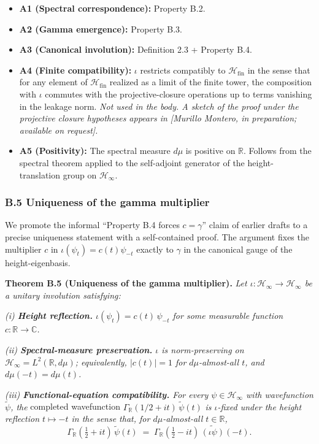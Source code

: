 \documentclass[
  letterpaper,
  11pt]{article}
\providecommand{\tightlist}{%
  \setlength{\itemsep}{0pt}\setlength{\parskip}{0pt}}
\theoremstyle{plain}
\theoremstyle{definition}
\theoremstyle{remark}
\begin{document}
\begin{itemize}
\tightlist
\item
  \textbf{A1 (Spectral correspondence):} Property B.2.
\item
  \textbf{A2 (Gamma emergence):} Property B.3.
\item
  \textbf{A3 (Canonical involution):} Definition 2.3 + Property B.4.
\item
  \textbf{A4 (Finite compatibility):} \(\iota\) restricts compatibly to \(\mathcal{H}_\text{fin}\) in the sense that for any element of \(\mathcal{H}_\text{fin}\) realized as a limit of the finite tower, the composition with \(\iota\) commutes with the projective-closure operations up to terms vanishing in the leakage norm. \emph{Not used in the body. A sketch of the proof under the projective closure hypotheses appears in {[}Murillo Montero, in preparation; available on request{]}.}
\item
  \textbf{A5 (Positivity):} The spectral measure \(d\mu\) is positive on \(\mathbb{R}\). Follows from the spectral theorem applied to the self-adjoint generator of the height-translation group on \(\mathcal{H}_\infty\).
\end{itemize}

\subsubsection{B.5 Uniqueness of the gamma multiplier}\label{b.5-uniqueness-of-the-gamma-multiplier}

We promote the informal ``Property B.4 forces \(c = \gamma\)'' claim of earlier drafts to a precise uniqueness statement with a self-contained proof. The argument fixes the multiplier \(c\) in \(\iota(\psi_t) = c(t)\psi_{-t}\) exactly to \(\gamma\) in the canonical gauge of the height-eigenbasis.

\textbf{Theorem B.5 (Uniqueness of the gamma multiplier).} \emph{Let \(\iota: \mathcal{H}_\infty \to \mathcal{H}_\infty\) be a unitary involution satisfying:}

\emph{(i) \textbf{Height reflection.} \(\iota(\psi_t) = c(t)\,\psi_{-t}\) for some measurable function \(c: \mathbb{R} \to \mathbb{C}\).}

\emph{(ii) \textbf{Spectral-measure preservation.} \(\iota\) is norm-preserving on \(\mathcal{H}_\infty = L^2(\mathbb{R}, d\mu)\); equivalently, \(|c(t)| = 1\) for \(d\mu\)-almost-all \(t\), and \(d\mu(-t) = d\mu(t)\).}

\emph{(iii) \textbf{Functional-equation compatibility.} For every \(\psi \in \mathcal{H}_\infty\) with wavefunction \(\tilde\psi\), the} completed wavefunction \(\Gamma_{\mathbb{R}}(1/2+it)\,\tilde\psi(t)\) \emph{is \(\iota\)-fixed under the height reflection \(t \mapsto -t\) in the sense that, for \(d\mu\)-almost-all \(t \in \mathbb{R}\),}
\[\Gamma_{\mathbb{R}}\!\left(\tfrac{1}{2}+it\right)\,\tilde\psi(t) \;=\; \Gamma_{\mathbb{R}}\!\left(\tfrac{1}{2}-it\right)\,\widetilde{(\iota\psi)}(-t).\]
\end{document}
